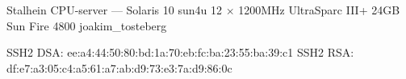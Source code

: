 \documentclass[a5paper]{article}
\begin{document}
   \computerdescription
       {Stalhein}
       {CPU-server}
       {---}
       {Solaris 10}
       {sun4u}
       {12 $\times$ 1200MHz UltraSparc III+}
       {24GB}
       {Sun Fire 4800}
       {joakim\_tosteberg}



   \sshfingerprintheading
   \begin{sshfingerprint}
SSH2 DSA: ee:a4:44:50:80:bd:1a:70:eb:fc:ba:23:55:ba:39:c1
SSH2 RSA: df:e7:a3:05:c4:a5:61:a7:ab:d9:73:e3:7a:d9:86:0c
   \end{sshfingerprint}
\end{document}
